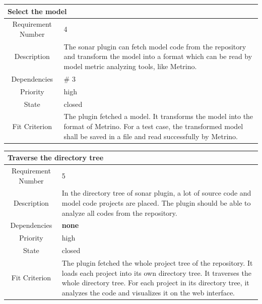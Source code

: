 \begin{table}[H]
\begin{tabular}{|c|p{10cm}|}
\hline 
\multicolumn{2}{|l|}{\textbf{Select the model}} \\ 
\hline 
Requirement Number & 4 \\ \hline 
Description & The sonar plugin can fetch model code from the repository and transform the model into a format which can be read by model metric analyzing tools, like Metrino. \\ \hline 
Dependencies & \# 3 \\ \hline 
Priority & high \\ \hline 
State & closed \\ \hline 
Fit Criterion & The plugin fetched a model. It transforms the model into the format of Metrino. For a test case, the transformed model shall be saved in a file and read successfully by Metrino. \\ \hline 
\end{tabular}
\end{table}
\vspace{-30mm}
\begin{table}[H]
\begin{tabular}{|c|p{10cm}|}
\hline 
\multicolumn{2}{|l|}{\textbf{Traverse the directory tree}} \\ 
\hline 
Requirement Number & 5 \\ \hline 
Description & In the directory tree of sonar plugin, a lot of source code and model code projects are placed. The plugin should be able to analyze all codes from the repository. \\ \hline 
Dependencies & \textbf{none} \\ \hline 
Priority & high \\ \hline 
State & closed \\ \hline 
Fit Criterion & The plugin fetched the whole project tree of the repository. It loads each project into its own directory tree. It traverses the whole directory tree. For each project in its directory tree, it analyzes the code and visualizes it on the web interface. \\ \hline 
\end{tabular}
\end{table}

